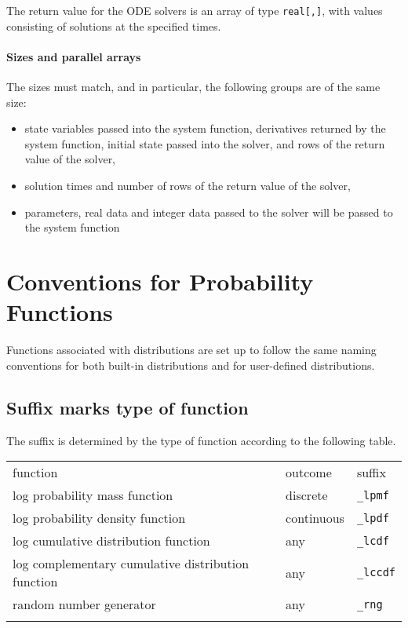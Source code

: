 \documentclass[
  10pt,
]{book}
\begin{document}
The return value for the ODE solvers is an array of type \texttt{real{[},{]}},
with values consisting of solutions at the specified times.

\hypertarget{sizes-and-parallel-arrays-1}{%
\subsubsection{Sizes and parallel arrays}\label{sizes-and-parallel-arrays-1}}

The sizes must match, and in particular, the following groups are of
the same size:

\begin{itemize}
\item
  state variables passed into the system function, derivatives
  returned by the system function, initial state passed into the
  solver, and rows of the return value of the solver,
\item
  solution times and number of rows of the return value of the
  solver,
\item
  parameters, real data and integer data passed to the solver will
  be passed to the system function
\end{itemize}

\hypertarget{conventions-for-probability-functions}{%
\chapter{Conventions for Probability Functions}\label{conventions-for-probability-functions}}

Functions associated with distributions are set up to follow the same
naming conventions for both built-in distributions and for
user-defined distributions.

\hypertarget{suffix-marks-type-of-function}{%
\section{Suffix marks type of function}\label{suffix-marks-type-of-function}}

The suffix is determined by the type of function according to the
following table.

\begin{longtable}[]{@{}lll@{}}
\toprule
function & outcome & suffix \\ \addlinespace
\midrule
\endhead
log probability mass function & discrete & \texttt{\_lpmf} \\ \addlinespace
log probability density function & continuous & \texttt{\_lpdf} \\ \addlinespace
log cumulative distribution function & any & \texttt{\_lcdf} \\ \addlinespace
log complementary cumulative distribution function & any & \texttt{\_lccdf} \\ \addlinespace
random number generator & any & \texttt{\_rng} \\ \addlinespace
\bottomrule
\end{longtable}
\end{document}
